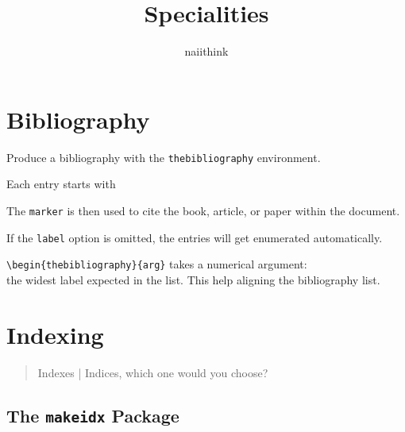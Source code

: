 \documentclass[a4paper]{article}
\title{Specialities}
\author{naiithink}
\date{}
\begin{document}
\begin{titlepage}
\maketitle
\thispagestyle{empty}
\tableofcontents
\end{titlepage}

\newpage
{}
\section{Bibliography}
Produce a bibliography with the \verb|thebibliography| environment.

Each entry starts with

\rule{0em}{2ex}


\rule{0em}{2ex}

The \texttt{marker} is then used to cite the book, article, or paper within the document.

\rule{0em}{2ex}


\rule{0em}{2ex}

If the \verb|label| option is omitted, the entries will get enumerated automatically.

\rule{0em}{2ex}

\verb|\begin{thebibliography}{arg}| takes a numerical argument:\\
the widest label expected in the list. This help aligning the \mbox{bibliography} list.


\newpage
\section{Indexing}

\begin{quote}
Indexes | Indices, which one would you choose?
\end{quote}

\subsection{The \texttt{makeidx} Package}
\end{document}

